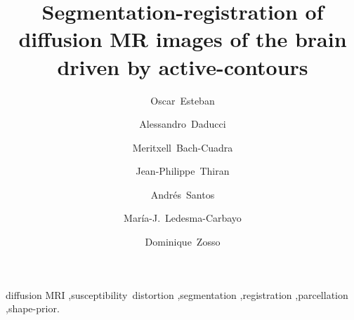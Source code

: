 \documentclass[5p,authoryear]{elsarticle}
\begin{document}
\begin{frontmatter}


\title{Segmentation-registration of diffusion MR images of the brain driven
by active-contours}

\author[bit]{Oscar~Esteban}
\author[lts5]{Alessandro~Daducci}
\author[chuv,lts5]{Meritxell~Bach-Cuadra}
\author[lts5]{Jean-Philippe~Thiran}
\author[bit]{Andr\'es~Santos}
\author[bit]{Mar\'ia-J.~Ledesma-Carbayo}
\author[ucla]{Dominique~Zosso}


\address[bit]{Biomedical Image Technologies (BIT), ETSI Telecomunicaci\'on, %
Universidad Polit\'ecnica de Madrid and CIBER-BBN, Madrid, Spain}
\address[lts5]{Signal Processing Laboratory (LTS5), \'Ecole Polytechnique
F\'ed\'erale de Lausanne (EPFL), Lausanne, Switzerland}
\address[chuv]{Dept. of Radiology, University
Hospital Center (CHUV) and University of Lausanne (UNIL), Lausanne, Switzerland}
\address[ucla]{Department of Mathematics, University of California,
Los Angeles (UCLA), Los Angeles, CA, US}

\begin{abstract}

\end{abstract}

\begin{keyword}
diffusion MRI \sep susceptibility~distortion \sep segmentation %
\sep registration \sep parcellation \sep shape-prior.
\end{keyword}

\end{frontmatter}



%






\appendix






\end{document}
